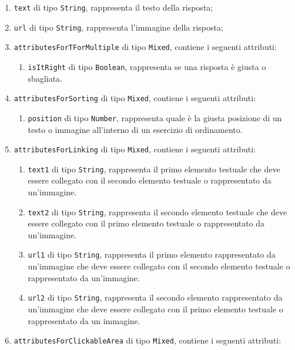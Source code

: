 \begin{itemize}
\begin{itemize}
\begin{itemize}
\begin{itemize}
\begin{enumerate}
						\item \texttt{text} di tipo \texttt{String}, rappresenta il testo della risposta;
        					\item \texttt{url} di tipo \texttt{String}, rappresenta l'immagine della risposta;
        					\item \texttt{attributesForTForMultiple} di tipo \texttt{Mixed}, contiene i seguenti attributi:
        					\begin{enumerate}
        						\item \texttt{isItRight} di tipo \texttt{Boolean}, rappresenta se una risposta è giusta o sbagliata.
						\end{enumerate}      
						\item \texttt{attributesForSorting} di tipo \texttt{Mixed}, contiene i seguenti attributi:
        					\begin{enumerate}
        						\item \texttt{position} di tipo \texttt{Number}, rappresenta quale è la giusta posizione di un testo o immagine all'interno di un esercizio di ordinamento.
						\end{enumerate}  
							\item \texttt{attributesForLinking} di tipo \texttt{Mixed}, contiene i seguenti attributi:
        					\begin{enumerate}
        						\item \texttt{text1} di tipo \texttt{String}, rappresenta il primo elemento testuale che deve essere collegato con il secondo elemento testuale o rappresentato da un'immagine.
        						\item \texttt{text2} di tipo \texttt{String}, rappresenta il secondo elemento testuale che deve essere collegato con il primo elemento testuale o rappresentato da un'immagine.
        						\item \texttt{url1} di tipo \texttt{String}, rappresenta il primo elemento rappresentato da un'immagine che deve essere collegato con il secondo elemento testuale o rappresentato da un'immagine.
        						\item \texttt{url2} di tipo \texttt{String}, rappresenta il secondo elemento rappresentato da un'immagine che deve essere collegato con il primo elemento testuale o rappresentato da un immagine.
						\end{enumerate}  
							\item \texttt{attributesForClickableArea} di tipo \texttt{Mixed}, contiene i seguenti attributi:
        					\begin{enumerate}

\end{enumerate}
\end{enumerate}
\end{itemize}
\end{itemize}
\end{itemize}
\end{itemize}
